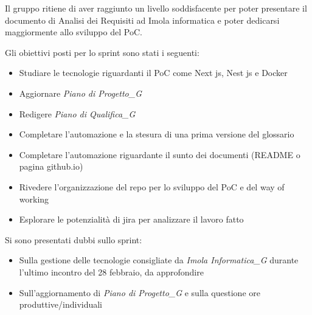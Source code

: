 Il gruppo ritiene di aver raggiunto un livello soddisfacente per poter presentare il documento di Analisi dei Requisiti ad Imola informatica e poter dedicarsi maggiormente allo sviluppo del PoC.

Gli obiettivi posti per lo sprint sono stati i seguenti:
\begin{itemize}
    \item Studiare le tecnologie riguardanti il PoC come Next js, Nest js e Docker
    \item Aggiornare \textit{Piano di Progetto_G}
    \item Redigere \textit{Piano di Qualifica_G}
    \item Completare l'automazione e la stesura di una prima versione del glossario
    \item Completare l'automazione riguardante il sunto dei documenti (README o pagina github.io)
    \item Rivedere l'organizzazione del repo per lo sviluppo del PoC e del way of working
    \item Esplorare le potenzialità di jira per analizzare il lavoro fatto
\end{itemize}

Si sono presentati dubbi sullo sprint:
\begin{itemize}
    \item Sulla gestione delle tecnologie consigliate da \textit{Imola Informatica_G} durante l'ultimo incontro del 28 febbraio, da approfondire
    \item Sull'aggiornamento di \textit{Piano di Progetto_G} e sulla questione ore produttive/individuali
\end{itemize}
